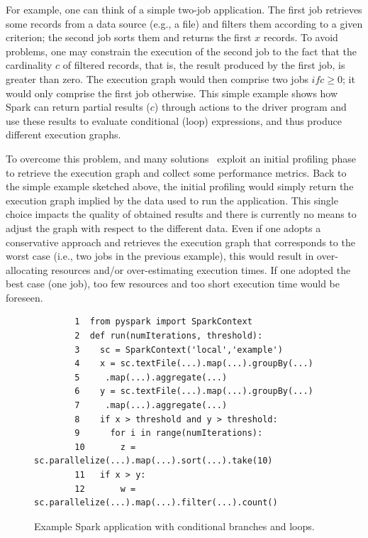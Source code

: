 For example, one can think of a simple two-job application. The first job retrieves some records from a data source (e.g., a file) and filters them according to a given criterion; the second job sorts them and returns the first $x$ records. To avoid problems, one may constrain the execution of the second job to the fact that the cardinality $c$ of filtered records, that is, the result produced by the first job, is greater than zero. The execution graph would then comprise two jobs $if c \geq 0$; it would only comprise the first job otherwise. This simple example shows how Spark can return partial results ($c$) through actions to the driver program and use these results to evaluate conditional (loop) expressions, and thus produce different execution graphs.

To overcome this problem, \cSpark and many solutions~\cite{Sidhanta2016, dSpark} exploit an initial profiling phase to retrieve the execution graph and collect some performance metrics. Back to the simple example sketched above, the initial profiling would simply return the execution graph implied by the data used to run the application. This single choice impacts the quality of obtained results and there is currently no means to adjust the graph with respect to the different data.
Even if one adopts a conservative approach and retrieves the execution graph that corresponds to the worst case (i.e., two jobs in the previous example), this would result in over-allocating resources and/or over-estimating execution times. If one adopted the best case (one job), too few resources and too short execution time would be foreseen.

\begin{figure}[htbp]
	\begin{small}
		\begin{verbatim}
		1  from pyspark import SparkContext
		2  def run(numIterations, threshold):
		3    sc = SparkContext('local','example')
		4  	 x = sc.textFile(...).map(...).groupBy(...)
		5     .map(...).aggregate(...)
		6    y = sc.textFile(...).map(...).groupBy(...)
		7     .map(...).aggregate(...)
		8    if x > threshold and y > threshold:
		9      for i in range(numIterations):
		10       z = sc.parallelize(...).map(...).sort(...).take(10)
		11   if x > y:
		12       w = sc.parallelize(...).map(...).filter(...).count()
		\end{verbatim}
	\end{small}
	\caption{Example Spark application with conditional branches and loops.}
	\label{fig:xdag2-code}
\end{figure}


